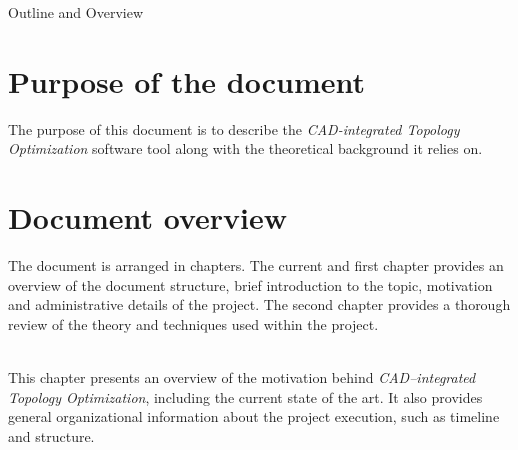 \clearemptydoublepage

{}

\begin{center}
	\huge{Outline and Overview}
\end{center}




\section*{Purpose of the document}
The purpose of this document is to describe the \emph{CAD-integrated Topology Optimization} software tool along with the theoretical background it relies on.
%

\section*{Document overview}
The document is arranged in chapters. The current and first chapter provides an overview of the document structure, brief introduction to the topic, motivation and administrative details of the project. The second chapter provides a thorough review of the theory and techniques used within the project.
\\
\\
  \vspace{1mm}

\noindent  This chapter presents an overview of the motivation behind \textit{CAD--integrated Topology Optimization}, including the current state of the art. It also provides general organizational information about the project execution, such as timeline and structure.
 \\


  \vspace{1mm}


